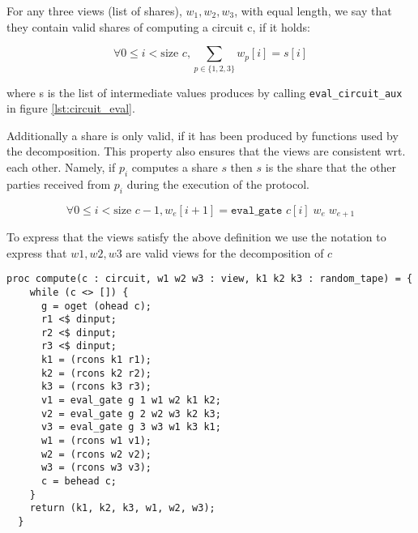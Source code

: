 \begin{definition}
  \label{def:decomp:valid_view}
  For any three views (list of shares), $w_{1}, w_{2}, w_{3}$, with equal length, we
  say that they contain valid shares of computing a circuit c, if it holds:

  \begin{equation}
    \label{eq:decomp:view:sum}
    \forall 0 \leq i < \text{size } c,
      \sum_{p \in \{1,2,3\}} w_{p}[i] = s[i]
  \end{equation}

  where s is the list of intermediate values produces by calling
  \texttt{eval\_circuit\_aux} in figure \ref{lst:circuit_eval}.

  Additionally a share is only valid, if it has been produced by functions used
  by the decomposition. This property also ensures that the views are consistent wrt. each other. Namely, if $p_{i}$ computes a share $s$ then $s$ is the share that the other parties received from $p_{i}$ during the execution of the protocol.

  \begin{equation}
    \label{eq:decomp:valid}
      \forall 0 \leq i < \text{size
                                                   } c - 1,  w_{e}[i+1] = \texttt{eval\_gate } c[i]\; w_{e} \; w_{e+1}
  \end{equation}

  To express that the views satisfy the above definition we use the notation
   to express that $w1, w2, w3$ are valid views for the
  decomposition of $c$

\end{definition}


\begin{lstlisting}[float,label=lst:decomp_aux,caption= Incremental decomposition procedure]
  proc compute(c : circuit, w1 w2 w3 : view, k1 k2 k3 : random_tape) = {
    while (c <> []) {
      g = oget (ohead c);
      r1 <$ dinput;
      r2 <$ dinput;
      r3 <$ dinput;
      k1 = (rcons k1 r1);
      k2 = (rcons k2 r2);
      k3 = (rcons k3 r3);
      v1 = eval_gate g 1 w1 w2 k1 k2;
      v2 = eval_gate g 2 w2 w3 k2 k3;
      v3 = eval_gate g 3 w3 w1 k3 k1;
      w1 = (rcons w1 v1);
      w2 = (rcons w2 v2);
      w3 = (rcons w3 v3);
      c = behead c;
    }
    return (k1, k2, k3, w1, w2, w3);
  }
\end{lstlisting}

